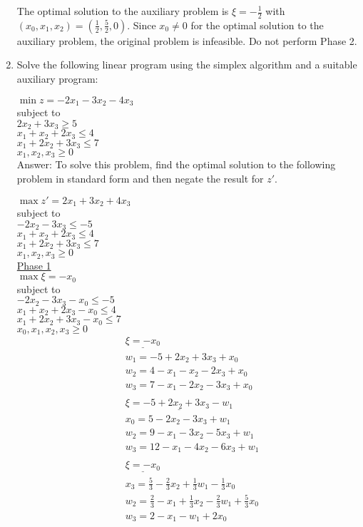 \documentclass{article}
\begin{document}
\begin{enumerate}
The optimal solution to the auxiliary problem is $\xi = -\frac{1}{2}$ with $(x_0, x_1, x_2) = (\frac{1}{2}, \frac{5}{2}, 0)$. Since $x_0 \neq 0$ for the optimal solution to the auxiliary problem, the original problem is infeasible. Do not perform Phase 2. 

\newpage
\item

Solve the following linear program using the simplex algorithm and a suitable auxiliary program:

$\min z = -2x_1 - 3x_2 - 4x_3$\\
subject to\\
$2x_2 + 3x_3 \geq 5$\\
$x_1 + x_2 + 2x_3 \leq 4$\\
$x_1 + 2x_2 + 3x_3 \leq 7$\\
$x_1, x_2, x_3 \geq 0$ \\

Answer: To solve this problem, find the optimal solution to the following problem in standard form and then negate the result for $z'$. 

$\max z' = 2x_1 + 3x_2 + 4x_3$\\
subject to\\
$-2x_2 - 3x_3 \leq -5$\\
$x_1 + x_2 + 2x_3 \leq 4$\\
$x_1 + 2x_2 + 3x_3 \leq 7$\\
$x_1, x_2, x_3 \geq 0$ \\

\underline{Phase 1}\\
$\max \xi = -x_0$\\
subject to\\
$-2x_2 - 3x_3 - x_0\leq -5$\\
$x_1 + x_2 + 2x_3 - x_0\leq 4$\\
$x_1 + 2x_2 + 3x_3 - x_0\leq 7$\\
$x_0, x_1, x_2, x_3 \geq 0$ \\

\begin{align*}
&\underline{\xi = -x_0} \\
&w_1 = -5 +2x_2 + 3x_3 + x_0\\
&w_2 = 4 - x_1 - x_2 - 2x_3 + x_0\\
&w_3 = 7 - x_1 - 2x_2 - 3x_3 + x_0 \\
&\\
&\underline{\xi = -5 + 2x_2 + 3x_3 - w_1} \\
&x_0 = 5 - 2x_2 - 3x_3 + w_1\\
&w_2 = 9  - x_1 - 3 x_2 - 5 x_3 + w_1\\
&w_3 =12 - x_1 -4x_2 - 6x_3 + w_1\\
&\\
&\underline{\xi = -x_0} \\
&x_3 = \frac{5}{3} - \frac{2}{3} x_2 + \frac{1}{3} w_1 - \frac{1}{3}x_0\\
&w_2 = \frac{2}{3} -x_1 + \frac{1}{3}x_2 - \frac{2}{3}w_1+ \frac{5}{3}x_0\\
&w_3 = 2 - x_1 - w_1 + 2x_0\\
&\\
\end{align*}


\end{enumerate}
\end{document}
